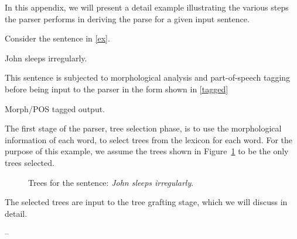 In this appendix, we will present a detail example illustrating the
various steps the parser performs in deriving the parse for a given
input sentence.

Consider the sentence in \ref{ex}.

\begin{example}
\label{ex}
John sleeps irregularly.	
\end{example}

This sentence is subjected to morphological analysis and
part-of-speech tagging before being input to the parser in the form
shown in \ref{tagged}

\begin{example}
\label{tagged}
Morph/POS tagged output.
\end{example}

The first stage of the parser, tree selection phase, is to use the
morphological information of each word, to select trees from the
lexicon for each word. For the purpose of this example, we assume the
trees shown in Figure~\ref{parse-det} to be the only trees selected.
\begin{figure}
\caption{Trees for the sentence: {\it John sleeps irregularly}.}
\label{parse-det}
\end{figure}
The selected trees are input to the tree grafting stage, which we will
discuss in detail.


-- 










